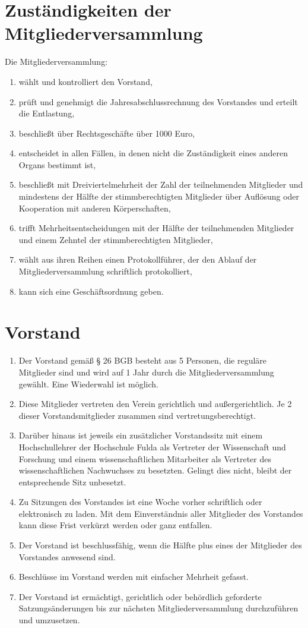 \documentclass[ngerman]{article}
\begin{document}
\section{Zuständigkeiten der Mitgliederversammlung}
Die Mitgliederversammlung:
\begin{enumerate}
\item wählt und kontrolliert den Vorstand,
\item prüft und genehmigt die Jahresabschlussrechnung des Vorstandes und erteilt die Entlastung,
\item beschließt über Rechtsgeschäfte über 1000 Euro,
\item entscheidet in allen Fällen, in denen nicht die Zuständigkeit eines anderen Organs bestimmt ist,
\item beschließt mit Dreiviertelmehrheit der Zahl der teilnehmenden Mitglieder und mindestens der Hälfte der stimmberechtigten Mitglieder über Auflösung oder Kooperation mit anderen Körperschaften,
\item trifft Mehrheitsentscheidungen mit der Hälfte der teilnehmenden Mitglieder und einem Zehntel der stimmberechtigten Mitglieder,
\item wählt aus ihren Reihen einen Protokollführer, der den Ablauf der Mitgliederversammlung schriftlich protokolliert,
\item kann sich eine Geschäftsordnung geben.
\end{enumerate}

\section{Vorstand}
\begin{enumerate}
\item Der Vorstand gemäß § 26 BGB besteht aus 5 Personen, die reguläre Mitglieder sind und wird auf 1 Jahr durch die Mitgliederversammlung gewählt. Eine Wiederwahl ist möglich.
\item Diese Mitglieder vertreten den Verein gerichtlich und außergerichtlich. Je 2 dieser Vorstandsmitglieder zusammen sind vertretungsberechtigt.
\item Darüber hinaus ist jeweils ein zusätzlicher Vorstandssitz mit einem Hochschullehrer der Hochschule Fulda als Vertreter der Wissenschaft
und Forschung und einem wissenschaftlichen Mitarbeiter als Vertreter des wissenschaftlichen Nachwuchses zu besetzten. Gelingt dies nicht,
bleibt der entsprechende Sitz unbesetzt.
\item Zu Sitzungen des Vorstandes ist eine Woche vorher schriftlich oder elektronisch zu laden. Mit dem Einverständnis aller Mitglieder des
Vorstandes kann diese Frist verkürzt werden oder ganz entfallen.
\item Der Vorstand ist beschlussfähig, wenn die Hälfte plus eines der Mitglieder des Vorstandes anwesend sind.
\item Beschlüsse im Vorstand werden mit einfacher Mehrheit gefasst.
\item Der Vorstand ist ermächtigt, gerichtlich oder behördlich geforderte Satzungsänderungen bis zur nächsten Mitgliederversammlung durchzuführen und umzusetzen.
\end{enumerate}
\end{document}
